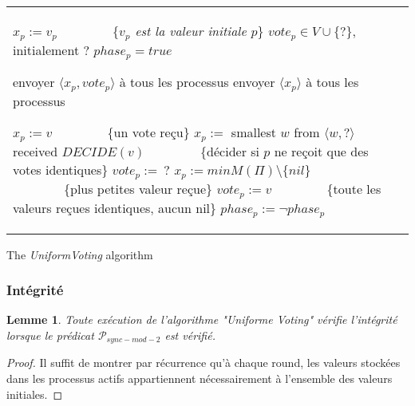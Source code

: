 \documentclass{article}
\newtheorem{lemma}{Lemme}[section]
\begin{document}
\begin{algorithm}[htb]
\scriptsize{
\begin{distribalgo}[1]
\begin{tabular}{ll}
\begin{minipage}{33em}


\INDENT{\textbf{Initialisation:}}
  \STATE $x_p := v_p$ ~~~~~~~~\{\emph{$v_p$ est la valeur initiale $p$}\}
  \STATE $vote_p \in V\cup\{ ? \}$, initialement $?$
  \STATE $phase_p = true$

\ENDINDENT
\BLANK

\INDENT{\textbf{Round $r$:}}
	\INDENT{$S_p^r:$}
		\IF{$phase_p$}
			\STATE envoyer $\langle x_p , vote_p \rangle$ à tous les processus
		\ELSE
			\STATE envoyer $\langle x_p \rangle$ à tous les processus
			\ENDIF
	\ENDINDENT
	\BLANK
	\INDENT{$T_p^r:$}

		\IF{$phase_p$}
			\IF{$M(q) = \langle v, v \rangle$}
				\STATE $x_p:= v$ ~~~~~~~~\{un vote reçu\}
			\ELSE
				\STATE $x_p :=$ smallest  $w$ from  $\langle w , ? \rangle$ received
			\ENDIF
			\IF{$M(\Pi) = \langle v, v \rangle$}
				\STATE $DECIDE(v)$ ~~~~~~~~\{décider si $p$ ne reçoit que des votes identiques\}
			\ENDIF
			\STATE $vote_p :=\ ?$
		\ELSE
			\STATE $ x_p := min M(\Pi) \setminus \{nil\}$ ~~~~~~~~\{plus petites valeur reçue\}
			\IF{$M(\Pi) = \{v\}$}
				\STATE $vote_p := v$ ~~~~~~~~\{toute les valeurs reçues identiques, aucun nil\}
			\ENDIF
		\ENDIF
		\STATE $phase_p := \neg phase_p$
	\ENDINDENT
\ENDINDENT

\end{minipage}
\end{tabular}

\caption{The {\em UniformVoting} algorithm}
\label{unifvotfig}
\end{distribalgo}
}
\end{algorithm}

\subsubsection{Intégrité}
\begin{lemma}
	Toute exécution de l'algorithme "Uniforme Voting" vérifie l'intégrité lorsque le prédicat $\mathcal{P}_{sync-mod-2}$ est vérifié.
\end{lemma}
\begin{proof}
	Il suffit de montrer par récurrence qu'à chaque round, les valeurs stockées dans les processus actifs appartiennent nécessairement à l'ensemble des valeurs initiales.
\end{proof}
\end{document}
